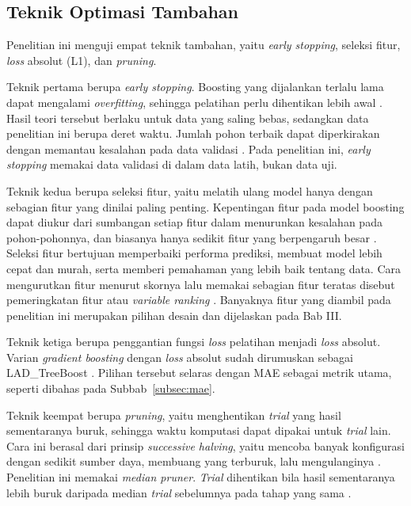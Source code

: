 \subsection{Teknik Optimasi Tambahan}
\label{subsec:teknik}
Penelitian ini menguji empat teknik tambahan, yaitu \textit{early stopping},
seleksi fitur, \textit{loss} absolut (L1), dan \textit{pruning}.

Teknik pertama berupa \textit{early stopping}. Boosting yang dijalankan
terlalu lama dapat mengalami \textit{overfitting}, sehingga pelatihan perlu
dihentikan lebih awal \cite{zhang2005}. Hasil teori tersebut berlaku untuk
data yang saling bebas, sedangkan data penelitian ini berupa deret waktu.
Jumlah pohon terbaik dapat diperkirakan dengan memantau kesalahan pada data
validasi \cite{hastie2009}. Pada penelitian ini, \textit{early stopping}
memakai data validasi di dalam data latih, bukan data uji.

Teknik kedua berupa seleksi fitur, yaitu melatih ulang model hanya dengan
sebagian fitur yang dinilai paling penting. Kepentingan fitur pada model
boosting dapat diukur dari sumbangan setiap fitur dalam menurunkan kesalahan
pada pohon-pohonnya, dan biasanya hanya sedikit fitur yang berpengaruh besar
\cite{hastie2009}. Seleksi fitur bertujuan memperbaiki performa prediksi,
membuat model lebih cepat dan murah, serta memberi pemahaman yang lebih baik
tentang data. Cara mengurutkan fitur menurut skornya lalu memakai sebagian
fitur teratas disebut pemeringkatan fitur atau \textit{variable ranking}
\cite{guyon2003}. Banyaknya fitur yang diambil pada penelitian ini merupakan
pilihan desain dan dijelaskan pada Bab III.

Teknik ketiga berupa penggantian fungsi \textit{loss} pelatihan menjadi
\textit{loss} absolut. Varian \textit{gradient boosting} dengan
\textit{loss} absolut sudah dirumuskan sebagai LAD\_TreeBoost
\cite{friedman2001}. Pilihan tersebut selaras dengan MAE sebagai metrik utama,
seperti dibahas pada Subbab~\ref{subsec:mae}.

Teknik keempat berupa \textit{pruning}, yaitu menghentikan \textit{trial} yang
hasil sementaranya buruk, sehingga waktu komputasi dapat dipakai untuk
\textit{trial} lain. Cara ini berasal dari prinsip \textit{successive halving},
yaitu mencoba banyak konfigurasi dengan sedikit sumber daya, membuang yang
terburuk, lalu mengulanginya \cite{li2018}. Penelitian ini memakai
\textit{median pruner}. \textit{Trial} dihentikan bila hasil sementaranya lebih
buruk daripada median \textit{trial} sebelumnya pada tahap yang sama
\cite{optunadocs}.


